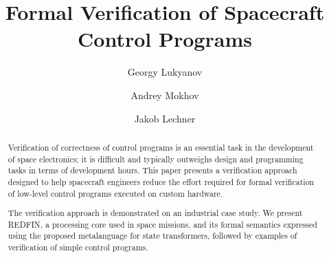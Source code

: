 \documentclass[acmsmall,screen]{acmart}
\begin{document}
\title[Formal Verification of Spacecraft Control Programs]{Formal Verification
of Spacecraft Control Programs}

\author{Georgy Lukyanov}
\author{Andrey Mokhov}
\author{Jakob Lechner}


\begin{abstract}
Verification of correctness of control programs is an essential task
in the development of space electronics; it is difficult and typically
outweighs design and programming tasks in terms of development hours.
This paper presents a verification approach designed to help
spacecraft engineers reduce the effort required for formal verification of
low-level control programs executed on custom hardware.


The verification approach is demonstrated on an industrial case study.
We present REDFIN, a processing core used in space missions, and its formal
semantics expressed using the proposed metalanguage for state transformers,
followed by examples of verification of simple control programs.

\end{abstract}

\keywords{}

\maketitle











\end{document}
